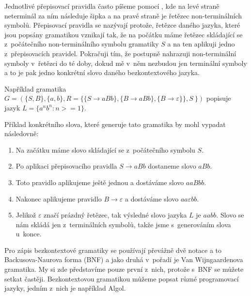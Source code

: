 Jednotlivé přepisovací pravidla často píšeme pomocí , kde na levé straně neterminál za ním následuje šipka a na pravé straně je řetězec non-terminálních symbolů. Přepisovací pravidla se nazývají protože, řetězce daného jazyka, které jsou popsány gramatikou vznikají tak, že na počátku máme řetězec skládající se z~počátečního non-terminálního symbolu gramatiky \(S\) a na ten aplikuji jedno z~přepisovacích pravidel. Pokračuji tím, že postupně nahrazuji non-terminální symboly v~řetězci do té doby, dokud mě v~něm nezbudou jen terminální symboly a to je pak jedno konkrétní slovo daného bezkontextového jazyka.

Například gramatika \( G = (\{S, B\}, \{ a, b\}, R = \{\{S \rightarrow aBb\}, \{B \rightarrow aBb\},\{B \rightarrow \varepsilon\}\}, S~\}) \) popisuje jazyk \( L = \{ a^n b^n : n >= 1 \}  \).

Příklad konkrétního slova, které generuje tato gramatika by mohl vypadat následovně:
\begin{enumerate}
	\item Na začátku máme slovo skládající se z~počátečního symbolu \(S\).
	\item Po aplikaci přepisovacího pravidla \(S \rightarrow aBb\) dostaneme slovo \(aBb\).
	\item Toto pravidlo aplikujeme ještě jednou a dostáváme slovo \(aaBbb\).
	\item Nakonec aplikujeme pravidlo \(B \rightarrow \varepsilon \) a dostáváme slovo \(aa\varepsilon bb\).
	\item Jelikož \(\varepsilon\) značí prázdný řetězec, tak výsledné slovo jazyka \(L\) je \(aabb\). Slovo se nám skládá jen z~terminálních symbolů, takže jsme s~generováním slova u~konce.
\end{enumerate}

Pro zápis bezkontextové gramatiky se používají převážně dvě notace a to Backusova-Naurova forma (BNF) a jako druhá v~pořadí je Van Wijngaardenova gramatika. My si zde představíme pouze první z~nich, protože s~BNF se můžete setkat častěji. Bezkontextovou gramatikou můžeme popsat různé programovací jazyky, jedním z~nich je například Algol. \cite{CFG}

